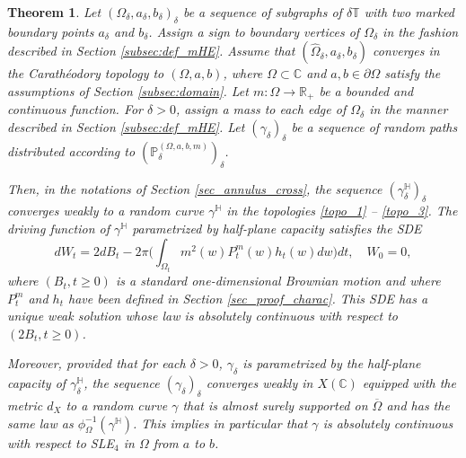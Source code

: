 \documentclass{article}
\newcommand{\PP}{{\mathbb{P}}}
\newcommand{\HH}{{\mathbb{H}}}
\newtheorem{theorem}{Theorem}[section]
\theoremstyle{definition}
\theoremstyle{remark}
\theoremstyle{remark}
\begin{document}
\begin{theorem} \label{theorem_final}
Let $(\Omega_{\delta}, a_{\delta}, b_{\delta})_{\delta}$ be a sequence of subgraphs of $\delta \mathbb{T}$ with two marked boundary points $a_{\delta}$ and $b_{\delta}$. Assign a sign to boundary vertices of $\Omega_{\delta}$ in the fashion described in Section \ref{subsec:def_mHE}. Assume that $(\hat \Omega_{\delta}, a_{\delta}, b_{\delta})$ converges in the Carath\'eodory topology to $(\Omega, a, b)$, where $\Omega \subset \mathbb{C}$ and $a,b \in \partial \Omega$ satisfy the assumptions of Section \ref{subsec:domain}. Let $m: \Omega \to \mathbb{R}_{+}$ be a bounded and continuous function. For $\delta >0$, assign a mass to each edge of $\Omega_{\delta}$ in the manner described in Section \ref{subsec:def_mHE}. Let $(\gamma_{\delta})_{\delta}$ be a sequence of random paths distributed according to $(\PP_{\delta}^{(\Omega,a,b,m)})_{\delta}$.

Then, in the notations of Section \ref{sec_annulus_cross}, the sequence $(\gamma_{\delta}^{\HH})_{\delta}$ converges weakly to a random curve $\gamma^{\HH}$ in the topologies \eqref{topo_1} -- \eqref{topo_3}. The driving function of $\gamma^{\HH}$ parametrized by half-plane capacity satisfies the SDE
\begin{equation} \label{SDE_ccl}
    dW_t = 2dB_t - 2\pi \bigg( \int_{\Omega_t} m^2(w)P_t^m(w)h_t(w)dw \bigg) dt, \quad W_0=0,
\end{equation}
where $(B_t, t \geq 0)$ is a standard one-dimensional Brownian motion and where $P_t^m$ and $h_t$ have been defined in Section \ref{sec_proof_charac}. This SDE has a unique weak solution whose law is absolutely continuous with respect to $(2B_t, t \geq 0)$.

Moreover, provided that for each $\delta > 0$, $\gamma_{\delta}$ is parametrized by the half-plane capacity of $\gamma_{\delta}^{\HH}$, the sequence $(\gamma_{\delta})_{\delta}$ converges weakly in $X(\mathbb{C})$ equipped with the metric $d_X$ to a random curve $\gamma$ that is almost surely supported on $\overline{\Omega}$ and has the same law as $\phi_{\Omega}^{-1}(\gamma^{\HH})$. This implies in particular that $\gamma$ is absolutely continuous with respect to SLE$_4$ in $\Omega$ from $a$ to $b$.
\end{theorem}
\end{document}
